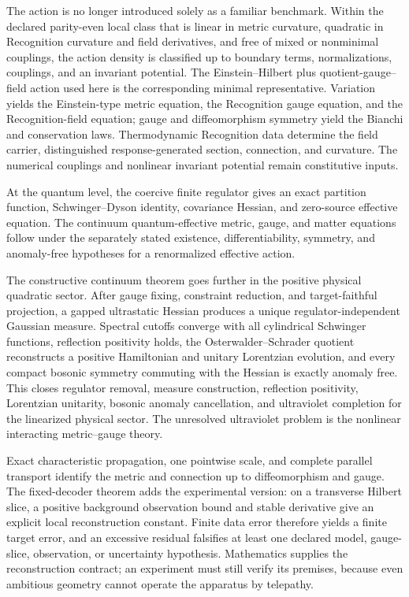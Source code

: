 The action is no longer introduced solely as a familiar benchmark.  Within the declared parity-even local class that is linear in metric curvature, quadratic in Recognition curvature and field derivatives, and free of mixed or nonminimal couplings, the action density is classified up to boundary terms, normalizations, couplings, and an invariant potential.  The Einstein--Hilbert plus quotient-gauge--field action used here is the corresponding minimal representative.  Variation yields the Einstein-type metric equation, the Recognition gauge equation, and the Recognition-field equation; gauge and diffeomorphism symmetry yield the Bianchi and conservation laws.  Thermodynamic Recognition data determine the field carrier, distinguished response-generated section, connection, and curvature.  The numerical couplings and nonlinear invariant potential remain constitutive inputs.

At the quantum level, the coercive finite regulator gives an exact partition function, Schwinger--Dyson identity, covariance Hessian, and zero-source effective equation.  The continuum quantum-effective metric, gauge, and matter equations follow under the separately stated existence, differentiability, symmetry, and anomaly-free hypotheses for a renormalized effective action.

The constructive continuum theorem goes further in the positive physical quadratic sector.  After gauge fixing, constraint reduction, and target-faithful projection, a gapped ultrastatic Hessian produces a unique regulator-independent Gaussian measure.  Spectral cutoffs converge with all cylindrical Schwinger functions, reflection positivity holds, the Osterwalder--Schrader quotient reconstructs a positive Hamiltonian and unitary Lorentzian evolution, and every compact bosonic symmetry commuting with the Hessian is exactly anomaly free.  This closes regulator removal, measure construction, reflection positivity, Lorentzian unitarity, bosonic anomaly cancellation, and ultraviolet completion for the linearized physical sector.  The unresolved ultraviolet problem is the nonlinear interacting metric--gauge theory.

Exact characteristic propagation, one pointwise scale, and complete parallel transport identify the metric and connection up to diffeomorphism and gauge.  The fixed-decoder theorem adds the experimental version: on a transverse Hilbert slice, a positive background observation bound and stable derivative give an explicit local reconstruction constant.  Finite data error therefore yields a finite target error, and an excessive residual falsifies at least one declared model, gauge-slice, observation, or uncertainty hypothesis.  Mathematics supplies the reconstruction contract; an experiment must still verify its premises, because even ambitious geometry cannot operate the apparatus by telepathy.

